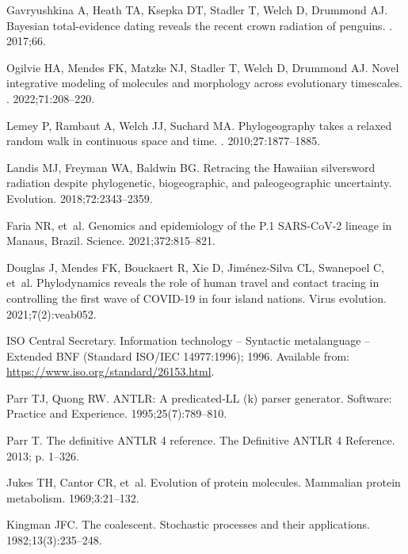 \documentclass[10pt,letterpaper,table]{article}
\theoremstyle{definition}
\begin{document}
\begin{thebibliography}{10}
Gavryushkina A, Heath TA, Ksepka DT, Stadler T, Welch D, Drummond AJ.
\newblock Bayesian total-evidence dating reveals the recent crown radiation of
  penguins.
. 2017;66.

Ogilvie HA, Mendes FK, Matzke NJ, Stadler T, Welch D, Drummond AJ.
\newblock Novel integrative modeling of molecules and morphology across
  evolutionary timescales.
. 2022;71:208--220.

Lemey P, Rambaut A, Welch JJ, Suchard MA.
\newblock Phylogeography takes a relaxed random walk in continuous space and
  time.
. 2010;27:1877--1885.

Landis MJ, Freyman WA, Baldwin BG.
\newblock Retracing the {H}awaiian silversword radiation despite phylogenetic,
  biogeographic, and paleogeographic uncertainty.
\newblock Evolution. 2018;72:2343--2359.

Faria NR, et~al.
\newblock Genomics and epidemiology of the {P.1 SARS-CoV-2 lineage in Manaus,
  Brazil}.
\newblock Science. 2021;372:815--821.

Douglas J, Mendes FK, Bouckaert R, Xie D, Jim{\'e}nez-Silva CL, Swanepoel C,
  et~al.
\newblock Phylodynamics reveals the role of human travel and contact tracing in
  controlling the first wave of COVID-19 in four island nations.
\newblock Virus evolution. 2021;7(2):veab052.

{ISO Central Secretary}. Information technology -- Syntactic metalanguage --
  Extended BNF (Standard ISO/IEC 14977:1996); 1996.
\newblock Available from: \url{https://www.iso.org/standard/26153.html}.

Parr TJ, Quong RW.
\newblock ANTLR: A predicated-LL (k) parser generator.
\newblock Software: Practice and Experience. 1995;25(7):789--810.

Parr T.
\newblock The definitive ANTLR 4 reference.
\newblock The Definitive ANTLR 4 Reference. 2013; p. 1--326.

Jukes TH, Cantor CR, et~al.
\newblock Evolution of protein molecules.
\newblock Mammalian protein metabolism. 1969;3:21--132.

Kingman JFC.
\newblock The coalescent.
\newblock Stochastic processes and their applications. 1982;13(3):235--248.


\end{thebibliography}
\end{document}
